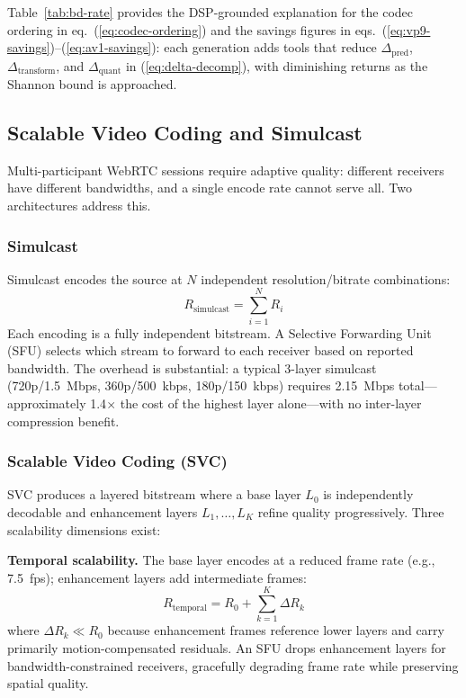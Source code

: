 Table~\ref{tab:bd-rate} provides the DSP-grounded explanation for the codec
ordering in eq.~(\ref{eq:codec-ordering}) and the savings figures in
eqs.~(\ref{eq:vp9-savings})--(\ref{eq:av1-savings}): each generation adds
tools that reduce $\Delta_{\text{pred}}$, $\Delta_{\text{transform}}$, and
$\Delta_{\text{quant}}$ in (\ref{eq:delta-decomp}), with diminishing
returns as the Shannon bound is approached.

\subsection{Scalable Video Coding and Simulcast}
\label{sec:svc-simulcast}

Multi-participant WebRTC sessions require adaptive quality: different
receivers have different bandwidths, and a single encode rate cannot serve
all. Two architectures address this.

\subsubsection{Simulcast}
\label{sec:simulcast}

Simulcast encodes the source at $N$ independent resolution/bitrate
combinations:
\begin{equation}
  R_{\text{simulcast}} = \sum_{i=1}^{N} R_i
  \label{eq:simulcast-rate}
\end{equation}
Each encoding is a fully independent bitstream. A Selective Forwarding
Unit (SFU) selects which stream to forward to each receiver based on
reported bandwidth. The overhead is substantial: a typical 3-layer
simulcast (720p/1.5~Mbps, 360p/500~kbps, 180p/150~kbps) requires
2.15~Mbps total---approximately 1.4$\times$ the cost of the highest
layer alone---with no inter-layer compression benefit.

\subsubsection{Scalable Video Coding (SVC)}
\label{sec:svc}

SVC produces a layered bitstream where a base layer $L_0$ is independently
decodable and enhancement layers $L_1, \ldots, L_K$ refine quality
progressively. Three scalability dimensions exist:

\textbf{Temporal scalability.} The base layer encodes at a reduced frame
rate (e.g., 7.5~fps); enhancement layers add intermediate frames:
\begin{equation}
  R_{\text{temporal}} = R_0 + \sum_{k=1}^{K} \Delta R_k
  \label{eq:temporal-svc}
\end{equation}
where $\Delta R_k \ll R_0$ because enhancement frames reference lower
layers and carry primarily motion-compensated residuals. An SFU drops
enhancement layers for bandwidth-constrained receivers, gracefully
degrading frame rate while preserving spatial quality.

